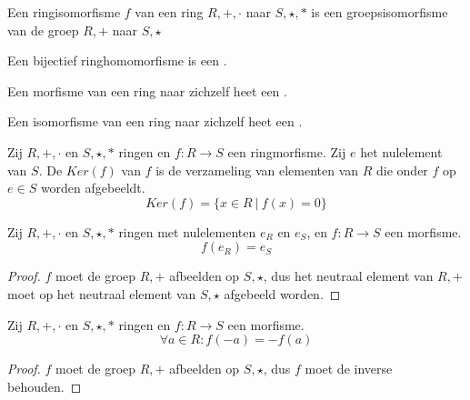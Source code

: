 \documentclass[main.tex]{subfiles}
\begin{document}
\begin{opm}
  Een ringisomorfisme $f$ van een ring $R,+,\cdot$ naar $S,\star,*$ is een groepsisomorfisme van de groep $R,+$ naar $S,\star$
\end{opm}

\begin{de}
  Een bijectief ringhomomorfisme is een .
\end{de}

\begin{de}
  Een morfisme van een ring naar zichzelf heet een .
\end{de}

\begin{de}
  Een isomorfisme van een ring naar zichzelf heet een .
\end{de}

\begin{de}
  Zij $R,+,\cdot$ en $S,\star,*$ ringen en $f:R \rightarrow S$ een ringmorfisme.
  Zij $e$ het nulelement van $S$.
  De  $Ker(f)$ van $f$ is de verzameling van elementen van $R$ die onder $f$ op $e\in S$ worden afgebeeldt.
  \[ Ker(f) = \{ x \in R \ |\ f(x) = 0 \} \]
\end{de}

\begin{ei}
  Zij $R,+,\cdot$ en $S,\star,*$ ringen met nulelementen $e_{R}$ en $e_{S}$, en $f:R \rightarrow S$ een morfisme.
  \[ f(e_{R}) = e_{S} \]

  \begin{proof}
    $f$ moet de groep $R,+$ afbeelden op $S,\star$, dus het neutraal element van $R,+$ moet op het neutraal element van $S,\star$ afgebeeld worden.
  \end{proof}
\end{ei}
 
\begin{ei}
  Zij $R,+,\cdot$ en $S,\star,*$ ringen en $f:R \rightarrow S$ een morfisme.
  \[ \forall a \in R: f(-a) = -f(a) \]

  \begin{proof}
    $f$ moet de groep $R,+$ afbeelden op $S,\star$, dus $f$ moet de inverse behouden.
  \end{proof}
\end{ei}
\end{document}
